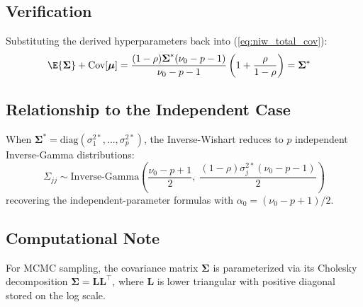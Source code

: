 \subsection{Verification}

Substituting the derived hyperparameters back into (\ref{eq:niw_total_cov}):
\begin{align}
  \E{\boldsymbol{\Sigma}} + \text{Cov}[\boldsymbol{\mu}]
  &= \frac{(1-\rho) \boldsymbol{\Sigma}^* (\nu_0 - p - 1)}{\nu_0 - p - 1}
     \left(1 + \frac{\rho}{1 - \rho}\right) = \boldsymbol{\Sigma}^*
\end{align}

\subsection{Relationship to the Independent Case}

When $\boldsymbol{\Sigma}^* = \text{diag}(\sigma_1^{2*}, \ldots,
\sigma_p^{2*})$, the Inverse-Wishart reduces to $p$ independent Inverse-Gamma
distributions:
\begin{equation}
  \Sigma_{jj} \sim \text{Inverse-Gamma}\!\left(
    \frac{\nu_0 - p + 1}{2},\;
    \frac{(1-\rho) \sigma_j^{2*} (\nu_0 - p - 1)}{2}
  \right)
\end{equation}
recovering the independent-parameter formulas with $\alpha_0 = (\nu_0 - p + 1)/2$.

\subsection{Computational Note}

For MCMC sampling, the covariance matrix $\boldsymbol{\Sigma}$ is
parameterized via its Cholesky decomposition $\boldsymbol{\Sigma} =
\mathbf{L}\mathbf{L}^\top$, where $\mathbf{L}$ is lower triangular with
positive diagonal stored on the log scale.

\pagebreak
